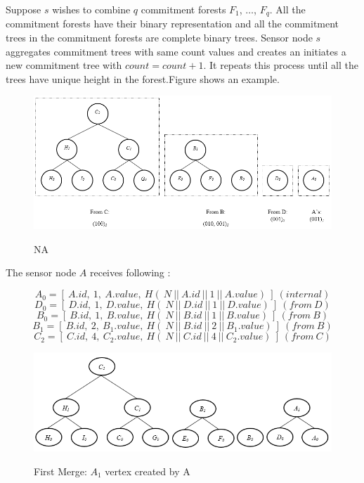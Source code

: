 		Suppose $s$ wishes to combine $q$ commitment forests $F_{1}$, $\dotsc$, $F_{q}$.
		All the commitment forests have their binary representation and all the commitment trees in the commitment forests are complete binary trees. 
		Sensor node $s$ aggregates commitment trees with same count values and creates an initiates a new commitment tree with $count = count + 1$. It repeats this process until all the trees have unique height in the forest.Figure shows an example.


	\newpage
	\begin{figure}[hp]
		\centering
		\includegraphics[scale = 0.7]{images/commitment-tree-example-1.png}\\
		\caption{NA}
	\end{figure}

	The sensor node $A$ receives following \payloads:

	\begin{equation}
		A_{0} = [\ A.id,\ 1,\ A.value,\ H  (\ N\ ||\ A.id\ ||\ 1\ ||\ A.value)\ ]\ (internal)
	\end{equation}
	\begin{equation}
		D_{0} = [\ D.id,\ 1,\ D.value,\ H(\ N\ ||\ D.id\ ||\ 1\ ||\ D.value)\ ]\ (from\ D)
	\end{equation}
	\begin{equation}
		B_{0} = [\ B.id,\ 1,\ B.value,\ H(\ N\ ||\ B.id\ ||\ 1\ ||\ B.value)\ ]\ (from\ B)
	\end{equation}
	\begin{equation}
		B_{1} = [\ B.id,\ 2,\ B_{1}.value,\ H(\ N\ ||\ B.id\ ||\ 2\ ||\ B_{1}.value)\ ]\ (from\ B)
	\end{equation}
	\begin{equation}
		C_{2} = [\ C.id,\ 4,\ C_{2}.value,\ H(\ N\ ||\ C.id\ ||\ 4\ ||\ C_{2}.value)\ ]\ (from\ C)
	\end{equation}
	
	\begin{figure}[hp]
		\centering
		\includegraphics[scale = 0.7]{images/commitment-tree-example-2.png}\\
		\caption{First Merge: $A_{1}$ vertex created by A}
	\end{figure}


